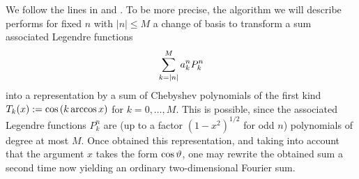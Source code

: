 We follow the lines in \cite{postta97} and \cite{kupo02}. To be more precise, the algorithm we will describe 
performs for fixed $n$ with $|n| \le M$ a change of basis to 
transform a sum associated Legendre functions
\begin{equation}
  \label{NFSFT:LegendreSum}
  \sum_{k=\left\vert n\right\vert}^M a_{k}^n P_{k}^n
\end{equation}
into a representation by a sum of Chebyshev polynomials of the first kind $T_{k}{\hspace{-0.4ex}}\left(x\right) := \cos{\hspace{-0.4ex}}\left(k \arccos x\right)$ for
$k=0,\ldots,M$. 
This is possible, since the associated Legendre functions $P_{k}^n$ are (up to a factor $(1-x^2)^{1/2}$ 
for odd $n$) polynomials of degree at most $M$. Once obtained this representation, and taking into account 
that the argument $x$ takes the form $\cos \vartheta$, one may rewrite the obtained sum a second time now yielding
an ordinary two-dimensional Fourier sum.


